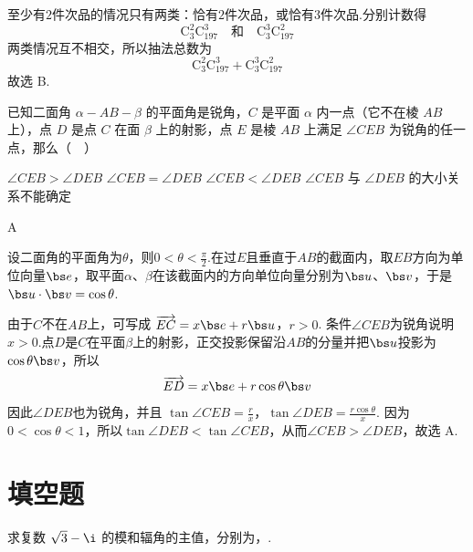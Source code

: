 \documentclass[UTF8,a4paper,oneside,11pt]{ctexbook}
\begin{document}
\begin{solution}
至少有\(2\)件次品的情况只有两类：恰有\(2\)件次品，或恰有\(3\)件次品.分别计数得
\[
\mathrm C_3^2\mathrm C_{197}^3
\quad\text{和}\quad
\mathrm C_3^3\mathrm C_{197}^2
\]
两类情况互不相交，所以抽法总数为
\[
\mathrm C_3^2\mathrm C_{197}^3+\mathrm C_3^3\mathrm C_{197}^2
\]
故选 B.
\end{solution}

\begin{problem}

已知二面角 \(\alpha-AB-\beta\) 的平面角是锐角，\(C\) 是平面 \(\alpha\) 内一点（它不在棱 \(AB\) 上），点 \(D\) 是点 \(C\) 在面 \(\beta\) 上的射影，点 \(E\) 是棱 \(AB\) 上满足 \(\angle CEB\) 为锐角的任一点，那么（\(\quad\)）

\choices
    {\(\angle CEB > \angle DEB\)}
    {\(\angle CEB = \angle DEB\)}
    {\(\angle CEB < \angle DEB\)}
    {\(\angle CEB\) 与 \(\angle DEB\) 的大小关系不能确定}
\end{problem}

\begin{answer}
A
\end{answer}

\begin{solution}
设二面角的平面角为\(\theta\)，则\(0<\theta<\frac{\pi}{2}\).在过\(E\)且垂直于\(AB\)的截面内，取\(EB\)方向为单位向量\(\bs e\)，取平面\(\alpha\)、\(\beta\)在该截面内的方向单位向量分别为\(\bs u\)、\(\bs v\)，于是\(\bs u\cdot\bs v=\cos\theta\).

由于\(C\)不在\(AB\)上，可写成
\(\overrightarrow{EC}=x\bs e+r\bs u\)，\(r>0\).
条件\(\angle CEB\)为锐角说明\(x>0\).点\(D\)是\(C\)在平面\(\beta\)上的射影，正交投影保留沿\(AB\)的分量并把\(\bs u\)投影为\(\cos\theta\bs v\)，所以
\[
\overrightarrow{ED}=x\bs e+r\cos\theta\bs v
\]
因此\(\angle DEB\)也为锐角，并且
\(\tan\angle CEB=\frac{r}{x}\)，\(\tan\angle DEB=\frac{r\cos\theta}{x}\).
因为\(0<\cos\theta<1\)，所以\(\tan\angle DEB<\tan\angle CEB\)，从而\(\angle CEB>\angle DEB\)，故选 A.
\end{solution}

\section{填空题}

\begin{problem}

求复数 \(\sqrt{3} - \i\) 的模和辐角的主值，分别为\fillinblank{}，\fillinblank{}.
\end{problem}
\end{document}
